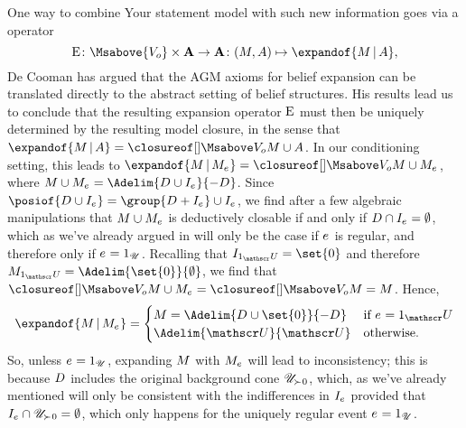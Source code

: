 \documentclass[preprint]{isipta2025}
\begin{document}
One way to combine Your statement model with such new information goes via a  operator
\begin{equation*}
\expand
\colon\Msabove{\zeroM}\times\As\to\As
\colon(\M,\A)\mapsto\expandof{\M\given\A},
\end{equation*}
De Cooman \cite{cooman2003a} has argued that the AGM axioms for belief expansion \cite{alchourron1985,gardenfors1988} can be translated directly to the abstract setting of belief structures.
His results lead us to conclude that the resulting expansion operator \(\mathrm{E}\) must then be uniquely determined by the resulting model closure, in the sense that \(\expandof{\M\given\A}=\Mclsbgof{\zeroM}{\M\union\A}\).
In our conditioning setting, this leads to \(\expandof{\M\given\eventM}=\Mclsbgof{\zeroM}{\M\union\eventM}\), where \(\M\union\eventM=\Adelim{\desirset\cup\eventindifset}{-\desirset}\).
Since \(\posiof{\desirset\cup\eventindifset}=\group{\desirset+\eventindifset}\cup\eventindifset\), we find after a few algebraic manipulations that \(M\cup M_{e_{}}\) is deductively closable if and only if \(D_{}\cap I_{{e_{}}}=\emptyset\), which as we've already argued in  will only be the case if \(e_{}\) is regular, and therefore only if \(e_{}=1_{\mathscr{U}}\).
Recalling that \(\indifset[\uniteventopt]=\set{0}\) and therefore \(\M_{\uniteventopt}=\Adelim{\set{0}}{\emptyset}\), we find that \(\Mclsbgof{\zeroM}{\M\union\eventM}=\Mclsbgof{\zeroM}{\M}=\M\).
Hence,
\begin{equation}\label{eq:expand}
\expandof{\M\given\eventM}\\
=\begin{cases}
\M=\Adelim{\desirset\cup\set{0}}{-\desirset}
&\text{if \(\eventopt=\uniteventopt\)}\\
\Adelim{\opts}{\opts}
&\text{otherwise}.
\end{cases}
\end{equation}
So, unless \(e_{}=1_{\mathscr{U}}\), expanding \(M\) with \(M_{e_{}}\) will lead to  inconsistency; this is because \(D_{}\) includes the original background cone \(\mathscr{U}_{\mathrel{\succ_{}}0}\), which, as we've already mentioned  will only be consistent with the indifferences in \(I_{{e_{}}}\) provided that \(I_{{e_{}}}\cap\mathscr{U}_{\mathrel{\succ_{}}0}=\emptyset\), which only happens for the uniquely regular event \(e_{}=1_{\mathscr{U}}\).
\end{document}
